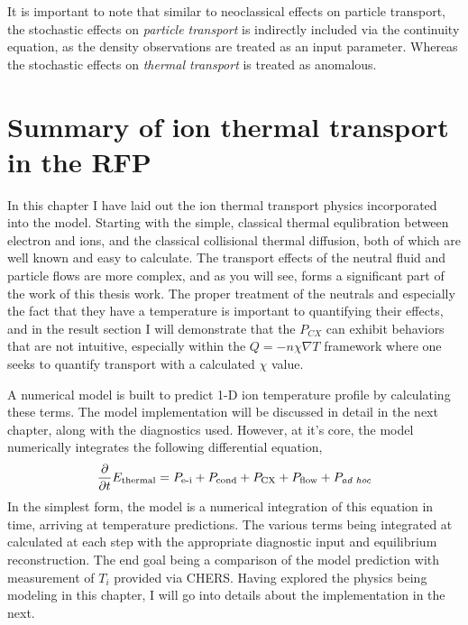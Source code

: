 \begin{refsection}
It is important to note that similar to neoclassical effects on particle transport, the stochastic effects on \emph{particle transport} is indirectly included via the continuity equation, as the density observations are treated as an input parameter. Whereas the stochastic effects on \emph{thermal transport} is treated as anomalous.

\section{Summary of ion thermal transport in the RFP}

In this chapter I have laid out the ion thermal transport physics incorporated into the model. Starting with the simple, classical thermal equlibration between electron and ions, and the classical collisional thermal diffusion, both of which are well known and easy to calculate. The transport effects of the neutral fluid and particle flows are more complex, and as you will see, forms a significant part of the work of this thesis work. The proper treatment of the neutrals and especially the fact that they have a temperature is important to quantifying their effects, and in the result section I will demonstrate that the $P_{CX}$ can exhibit behaviors that are not intuitive, especially within the $Q = -n\chi\nabla T$ framework where one seeks to quantify transport with a calculated $\chi$ value. 

A numerical model is built to predict 1-D ion temperature profile by calculating these terms. The model implementation will be discussed in detail in the next chapter, along with the diagnostics used. However, at it's core, the model numerically integrates the following differential equation,
\begin{align}
    \frac{\partial}{\partial t} E_\text{thermal} = P_\text{e-i} + P_\text{cond} + P_\text{CX} + P_\text{flow} + P_\textit{ad hoc}
\end{align}
In the simplest form, the model is a numerical integration of this equation in time, arriving at temperature predictions. The various terms being integrated at calculated at each step with the appropriate diagnostic input and equilibrium reconstruction. The end goal being a comparison of the model prediction with measurement of $T_i$ provided via CHERS. Having explored the physics being modeling in this chapter, I will go into details about the implementation in the next.  


\printbibliography%
\end{refsection}

